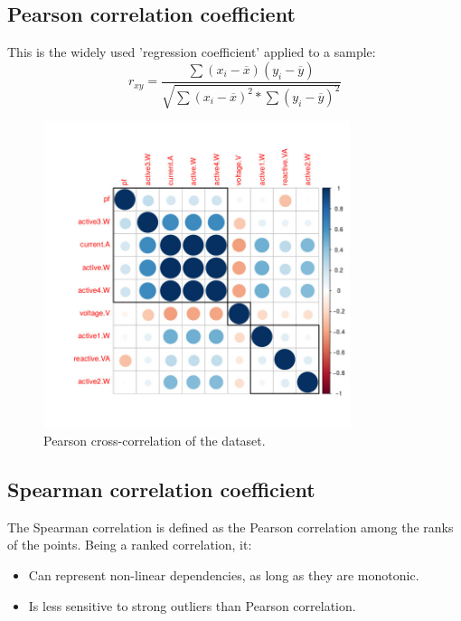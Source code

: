 \documentclass[11pt]{article}
\begin{document}
\subsection{Pearson correlation coefficient}
This is the widely used 'regression coefficient'\cite{q8} applied to a sample:
$$ r_{xy} = \frac{\sum(x_i - \overline{x})(y_i - \overline{y})}
                 {\sqrt{\sum(x_i - \overline{x})^2*\sum(y_i - \overline{y})^2}} $$
\begin{figure}[!htp]
  \centering
    \includegraphics[width=0.8\textwidth]{img/pearson}
    \caption{Pearson cross-correlation of the dataset.}
\end{figure}

\subsection{Spearman correlation coefficient}
The Spearman correlation is defined as the Pearson correlation among the ranks of the points.
Being a ranked correlation, it: 
\begin{itemize}
    \item{Can represent non-linear dependencies, as long as they are monotonic.\cite{q9}}
    \item{Is less sensitive to strong outliers than Pearson correlation\cite{q4}\cite{q9}.}
\end{itemize}
\end{document}
